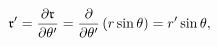 \begin{equation*}
\frak{r}^{\prime }=\frac{\partial \frak{r}}{\partial \theta ^{\prime }}=%
\frac{\partial }{\partial \theta ^{\prime }}\left( r\sin \theta \right)
=r^{\prime }\sin \theta ,
\end{equation*}


